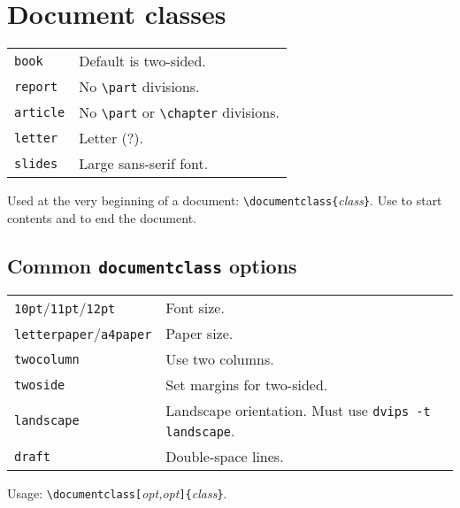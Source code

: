 \section{Document classes}
\begin{tabular}{@{}ll@{}}
\verb!book!    & Default is two-sided. \\
\verb!report!  & No \verb!\part! divisions. \\
\verb!article! & No \verb!\part! or \verb!\chapter! divisions. \\
\verb!letter!  & Letter (?). \\
\verb!slides!  & Large sans-serif font.
\end{tabular}

Used at the very beginning of a document:
\verb!\documentclass{!\textit{class}\verb!}!.  Use
\verb!! to start contents and \verb!! to
end the document.


\subsection{Common \texttt{documentclass} options}
\newlength{\MyLen}
\begin{tabular}{@{}p{\the\MyLen}%
                @{}p{\linewidth-\the\MyLen}@{}}
\texttt{10pt}/\texttt{11pt}/\texttt{12pt} & Font size. \\
\texttt{letterpaper}/\texttt{a4paper} & Paper size. \\
\texttt{twocolumn} & Use two columns. \\
\texttt{twoside}   & Set margins for two-sided. \\
\texttt{landscape} & Landscape orientation.  Must use
                     \texttt{dvips -t landscape}. \\
\texttt{draft}     & Double-space lines.
\end{tabular}

Usage:
\verb!\documentclass[!\textit{opt,opt}\verb!]{!\textit{class}\verb!}!.


